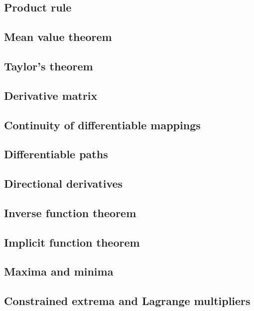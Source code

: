 \documentclass[11pt]{article}
\theoremstyle{definition}
\theoremstyle{plain}
\theoremstyle{remark}
\begin{document}
\subsection{Product rule}

\subsection{Mean value theorem}

\subsection{Taylor’s theorem}

\subsection{Derivative matrix}

\subsection{Continuity of differentiable mappings}

\subsection{Differentiable paths}

\subsection{Directional derivatives}

\subsection{Inverse function theorem}

\subsection{Implicit function theorem}

\subsection{Maxima and minima}

\subsection{Constrained extrema and Lagrange multipliers}
\end{document}
